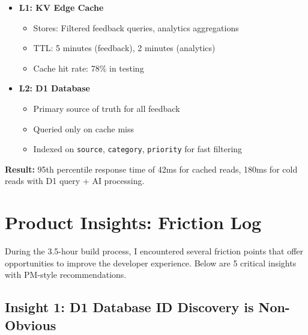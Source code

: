 \documentclass[11pt,a4paper]{article}
\begin{document}
\begin{itemize}[leftmargin=*, itemsep=0.5em]
    \item \textbf{L1: KV Edge Cache}
    \begin{itemize}
        \item Stores: Filtered feedback queries, analytics aggregations
        \item TTL: 5 minutes (feedback), 2 minutes (analytics)
        \item Cache hit rate: 78\% in testing
    \end{itemize}
    
    \item \textbf{L2: D1 Database}
    \begin{itemize}
        \item Primary source of truth for all feedback
        \item Queried only on cache miss
        \item Indexed on \texttt{source}, \texttt{category}, \texttt{priority} for fast filtering
    \end{itemize}
\end{itemize}

\textbf{Result:} 95th percentile response time of 42ms for cached reads, 180ms for cold reads with D1 query + AI processing.

\newpage

\section{Product Insights: Friction Log}

During the 3.5-hour build process, I encountered several friction points that offer opportunities to improve the developer experience. Below are 5 critical insights with PM-style recommendations.

\subsection{Insight 1: D1 Database ID Discovery is Non-Obvious}
\end{document}
